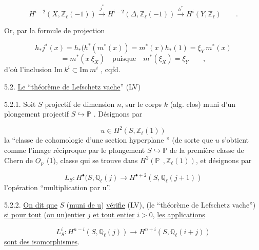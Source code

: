 \begin{equation*}
H^{i-2}(X,\mathbb{Z}_{\ell}(-1)) \stackrel{j^*}{\longrightarrow} H^{i-2}(\Delta,\mathbb{Z}_{\ell}(-1)) \stackrel{h^*}{\longrightarrow} H^i(Y,\mathbb{Z}_{\ell}) \qquad .
\end{equation*}


Or, par la formule de projection

\begin{equation*}
h_*j^*(x) = h_*(h^*(m^*(x)) = m^*(x)h_*(1) = \xi_Y\ m^*(x)
\end{equation*}
\begin{equation*}
= m^*(x\ \xi_X) \quad \mbox{puisque} \quad m^*(\xi_X) = \xi_Y \qquad ,
\end{equation*}
d'où l'inclusion $\mathrm{Im}\ k^i \subset \mathrm{Im}\ m^i$ , cqfd.


5.2.  \underline{Le ``théorème de Lefschetz vache}'' (LV)

5.2.1.  Soit $S$ projectif de dimension $n$, sur le corps $k$ (alg. clos) muni d'un plongement projectif $S \hookrightarrow \mathbb{P}$ . Désignons par

\begin{equation*}
u \in H^2(S,\mathbb{Z}_{\ell}(1))
\end{equation*}
la ``classe de cohomologie d'une section hyperplane '' (de sorte que $u$ s'obtient comme l'image réciproque par le plongement $S \hookrightarrow \mathbb{P}$ de la première classe de Chern de $\underline{O}_{\mathbb{P}}$ (1), classe qui se trouve dans $H^2(\mathbb{P}\ \ , \mathbb{Z}_{\ell}(1))$, et désignons par

\begin{equation*}
L_S : H^{\bullet}(S,\mathbb{Q}_{\ell}(j) \longrightarrow H^{\bullet+2}(S,\mathbb{Q}_{\ell}(j+1))
\end{equation*}
l'opération ``multiplication par u''.

5.2.2. \underline{On dit  que} $S$ (\underline{muni de u}) \underline{vérifie} (LV), (le ``théorème de Lefschetz vache'') \underline{si pour tout} (\underline{ou un})\underline{entier} $j$ \underline{et tout entier} $i > 0$, \underline{les applications}

\begin{equation*}
L_S^i : H^{n-i}(S,\mathbb{Q}_{\ell}(j)) \longrightarrow H^{n+i}(S,\mathbb{Q}_{\ell}(i+j))
\end{equation*}
\underline{sont des isomorphismes}.


